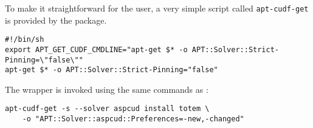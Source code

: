 To make it straightforward for the user, a very simple script called
\texttt{apt-cudf-get} is provided by the \aptcudf{} package.

\begin{verbatim}
#!/bin/sh
export APT_GET_CUDF_CMDLINE="apt-get $* -o APT::Solver::Strict-Pinning=\"false\""
apt-get $* -o APT::Solver::Strict-Pinning="false"
\end{verbatim}

The wrapper is invoked using the same commands as \aptget:

\begin{verbatim}
apt-cudf-get -s --solver aspcud install totem \
    -o "APT::Solver::aspcud::Preferences=-new,-changed"
\end{verbatim}
